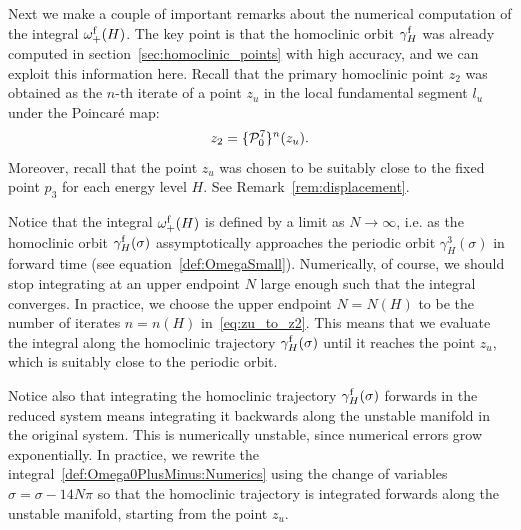 Next we make a couple of important remarks about the numerical
computation of the integral $\omega_+^{\mathrm{f}}(H)$.
The key point is that the homoclinic orbit $\gamma_H^{\mathrm{f}}$ was already
computed in section~\ref{sec:homoclinic_points} with high accuracy,
and we can exploit this information here.
Recall that the primary homoclinic point $z_2$ was obtained as the
$n$-th iterate of a point $z_u$ in the local fundamental segment $l_u$
under the Poincar\'e map:
\begin{equation} \label{eq:zu_to_z2}
 z_2 = \{\mathcal{P}_0^7\}^n (z_u).
\end{equation}
Moreover, recall that the point $z_u$ was chosen to be suitably close
to the fixed point $p_3$ for each energy level $H$.
See Remark~\ref{rem:displacement}. 

Notice that the integral $\omega_+^{\mathrm{f}}(H)$ is defined by a limit as
$N\to\infty$, i.e. as the homoclinic orbit $\gamma_H^{\mathrm{f}}(\sigma)$
assymptotically approaches the periodic orbit $\gamma_H^3(\sigma)$ in
forward time (see equation~\eqref{def:OmegaSmall}).
Numerically, of course, we should stop integrating at an upper
endpoint $N$ large enough such that the integral converges. 
In practice, we choose the upper endpoint $N=N(H)$ to be the number of
iterates $n=n(H)$ in~\eqref{eq:zu_to_z2}.
This means that we evaluate the integral along the homoclinic
trajectory $\gamma_H^{\mathrm{f}}(\sigma)$ until it reaches the point $z_u$,
which is suitably close to the periodic orbit.

Notice also that integrating the homoclinic trajectory
$\gamma_H^{\mathrm{f}}(\sigma)$ forwards in the reduced system means
integrating it backwards along the unstable manifold in the original
system. 
This is numerically unstable, since numerical errors grow
exponentially. 
In practice, we rewrite the
integral~\eqref{def:Omega0PlusMinus:Numerics} using the change of
variables $\hat \sigma = \sigma - 14N\pi$ so that the homoclinic
trajectory is integrated forwards along the unstable manifold,
starting from the point $z_u$.

